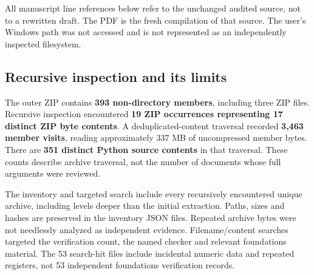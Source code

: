 \documentclass[
  10pt,
]{article}
\begin{document}
All manuscript line references below refer to the unchanged audited
source, not to a rewritten draft. The PDF is the fresh compilation of
that source. The user's Windows path was not accessed and is not
represented as an independently inspected filesystem.

\subsection{Recursive inspection and its
limits}\label{recursive-inspection-and-its-limits}

The outer ZIP contains \textbf{393 non-directory members}, including
three ZIP files. Recursive inspection encountered \textbf{19 ZIP
occurrences representing 17 distinct ZIP byte contents}. A
deduplicated-content traversal recorded \textbf{3,463 member visits},
reading approximately 337 MB of uncompressed member bytes. There are
\textbf{351 distinct Python source contents} in that traversal. These
counts describe archive traversal, not the number of documents whose
full arguments were reviewed.

The inventory and targeted search include every recursively encountered
unique archive, including levels deeper than the initial extraction.
Paths, sizes and hashes are preserved in the inventory JSON files.
Repeated archive bytes were not needlessly analyzed as independent
evidence. Filename/content searches targeted the verification count, the
named checker and relevant foundations material. The 53 search-hit files
include incidental numeric data and repeated registers, not 53
independent foundations verification records.
\end{document}
